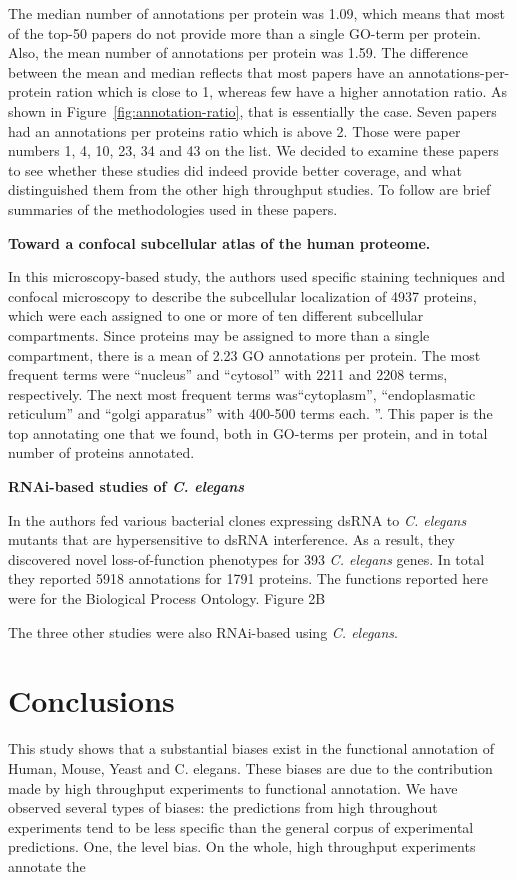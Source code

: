 \documentclass[10pt]{bmc_article}
\newenvironment{bmcformat}{\begin{raggedright}\baselineskip20pt\sloppy\setboolean{publ}{false}}{\end{raggedright}\baselineskip20pt\sloppy}
\begin{document}
\begin{bmcformat}
The median number of annotations per protein was 1.09, which means that most of the top-50
papers do not provide more than a single GO-term per protein. Also, the mean number of
annotations per protein was 1.59. The difference between the mean and median reflects that
most papers have an annotations-per-protein ration which is close to 1, whereas few have a
higher annotation ratio. As shown in Figure~\ref{fig:annotation-ratio}, that is essentially
the case. Seven papers had an annotations per proteins ratio which is above 2. Those
were paper numbers 1, 4, 10, 23, 34 and 43 on the list. We decided to examine these papers
to see whether these studies did indeed provide better coverage, and what distinguished them
from the other high throughput studies. To follow are brief summaries of the
methodologies used in these papers.

\textbf{Toward a confocal subcellular atlas of the human proteome.}

In this microscopy-based study, the authors used specific staining techniques and confocal
microscopy to describe the subcellular localization of 4937 proteins, which were each assigned
to one or more of ten different subcellular compartments. Since proteins may be assigned to more
than a single compartment, there is a mean of 2.23 GO annotations per protein. The most frequent
terms were ``nucleus'' and ``cytosol'' with 2211 and 2208 terms, respectively. The next
most frequent terms was``cytoplasm'', ``endoplasmatic reticulum'' and ``golgi apparatus'' with
400-500 terms each.  ''\cite{PMID:11121744}. This paper is the top annotating one that we found,
both in GO-terms per protein, and in total number of proteins annotated. 

\textbf{RNAi-based studies of \textit{C. elegans}}

In \cite{PMID:17417969} the authors fed various bacterial clones expressing dsRNA to \textit{C.
elegans} mutants that are hypersensitive to dsRNA interference. As  a result, they discovered
novel loss-of-function phenotypes for 393 \textit{C. elegans} genes. In total they reported 5918
annotations for 1791 proteins.  The functions reported here were for the Biological Process
Ontology. Figure 2B 

The three other studies were also RNAi-based using \textit{C. elegans}. 





\section*{Conclusions}
This study shows that a substantial biases exist in the functional annotation of Human, Mouse,
Yeast and C. elegans. These biases are due to the contribution made by high
throughput experiments to functional annotation. We have observed several types of biases: the predictions from
high throughout experiments tend to be less specific than the general corpus of experimental predictions. 
One, the level bias. On the whole, high throughput experiments annotate the 



\end{bmcformat}
\end{document}
